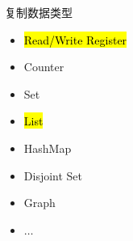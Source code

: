 \begin{frame}{}
  \begin{center}
    \begin{minipage}{0.50\textwidth}
      {\large 复制数据类型}  

      \vspace{0.20cm}
      \begin{itemize}
	\setlength{\itemsep}{4pt}
	\item \hl{Read/Write Register}
	\item Counter
	\item Set
	\item \hl{List}
	\item HashMap
	\item Disjoint Set
	\item Graph
	\item $\dots$
      \end{itemize}
    \end{minipage}
  \end{center}
\end{frame}

\begin{frame}{}
  \begin{columns}
      \centerline{\hl{}}
  \end{columns}

  \pause
  \vspace{0.30cm}
  \centerline{}
\end{frame}

\begin{frame}{}
\end{frame}

